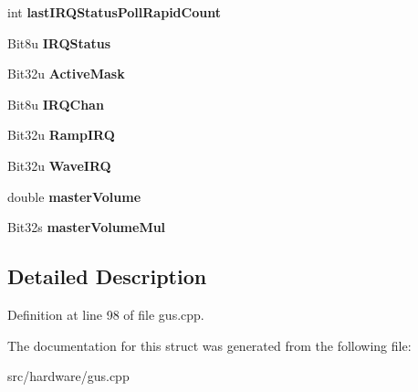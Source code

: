 \begin{DoxyCompactItemize}
\item 
\hypertarget{structGFGus_a7cf53be90ec9d8dfb4b22b3e004fd9cd}{int {\bfseries last\-I\-R\-Q\-Status\-Poll\-Rapid\-Count}}\label{structGFGus_a7cf53be90ec9d8dfb4b22b3e004fd9cd}

\item 
\hypertarget{structGFGus_af238c9e873d19d61f046063d83f111d1}{Bit8u {\bfseries I\-R\-Q\-Status}}\label{structGFGus_af238c9e873d19d61f046063d83f111d1}

\item 
\hypertarget{structGFGus_a2d78af798c38826042b4c8ef23ebe32f}{Bit32u {\bfseries Active\-Mask}}\label{structGFGus_a2d78af798c38826042b4c8ef23ebe32f}

\item 
\hypertarget{structGFGus_a4dcb3649a667a97aede4f09ded0ace2a}{Bit8u {\bfseries I\-R\-Q\-Chan}}\label{structGFGus_a4dcb3649a667a97aede4f09ded0ace2a}

\item 
\hypertarget{structGFGus_a6020128163cdd56bbb231a5c07630e24}{Bit32u {\bfseries Ramp\-I\-R\-Q}}\label{structGFGus_a6020128163cdd56bbb231a5c07630e24}

\item 
\hypertarget{structGFGus_aa5d5f4fadf04254e2d7d4c1e5b3ccffc}{Bit32u {\bfseries Wave\-I\-R\-Q}}\label{structGFGus_aa5d5f4fadf04254e2d7d4c1e5b3ccffc}

\item 
\hypertarget{structGFGus_a50fa87ed4026d42ccc1c854c0eab9c65}{double {\bfseries master\-Volume}}\label{structGFGus_a50fa87ed4026d42ccc1c854c0eab9c65}

\item 
\hypertarget{structGFGus_afaf9a55f59d75debcd2e17daf022fac6}{Bit32s {\bfseries master\-Volume\-Mul}}\label{structGFGus_afaf9a55f59d75debcd2e17daf022fac6}

\end{DoxyCompactItemize}


\subsection{Detailed Description}


Definition at line 98 of file gus.\-cpp.



The documentation for this struct was generated from the following file\-:\begin{DoxyCompactItemize}
\item 
src/hardware/gus.\-cpp\end{DoxyCompactItemize}
